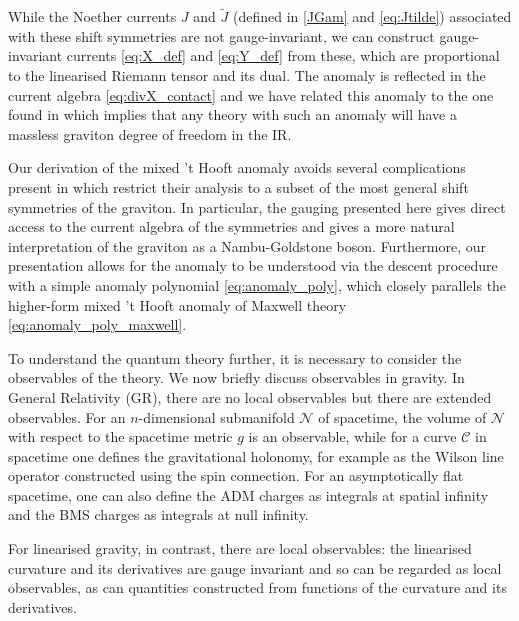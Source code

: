 While the Noether currents $J$ and $\tilde{J}$ (defined in \eqref{JGam} and \eqref{eq:Jtilde}) associated with these shift symmetries are not gauge-invariant, we can 
construct gauge-invariant currents \eqref{eq:X_def} and \eqref{eq:Y_def} from these, which are proportional to the linearised Riemann tensor and its dual. The anomaly is reflected in the current algebra \eqref{eq:divX_contact} and we have related this anomaly to the one found in \cite{Hinterbichler2023GravitySymmetries} which implies that any theory with such an anomaly will have a massless graviton degree of freedom in the IR. 

Our derivation of the mixed 't Hooft anomaly avoids several complications present in \cite{Hinterbichler2023GravitySymmetries} which restrict their analysis to a subset of the most general shift symmetries of the graviton. In particular, the gauging presented here gives direct access to the current algebra of the symmetries and gives a more natural interpretation of the graviton as a Nambu-Goldstone boson. Furthermore, our presentation allows for the anomaly to be understood via the descent procedure with a simple anomaly polynomial \eqref{eq:anomaly_poly}, which closely parallels the higher-form mixed 't Hooft anomaly of Maxwell theory \eqref{eq:anomaly_poly_maxwell}.

To understand the quantum theory further, it is necessary to consider the observables of the theory.
We now briefly discuss observables in gravity. In General Relativity (GR), there are no local observables but there are extended observables. For an $n$-dimensional submanifold $\mathcal{N}$ of spacetime, the volume of $\mathcal{N}$ with respect to the spacetime metric $g$ is an observable, while for a curve $\mathcal{C}$ in spacetime one defines the gravitational holonomy, for example as the Wilson line operator constructed using the spin connection. For an asymptotically flat spacetime, one can also define the ADM charges \cite{ADM, Abbott1982StabilityConstant} as integrals at spatial infinity and the BMS charges \cite{Bondi:1962px, Sachs:1962wk} as integrals at null infinity.

For linearised gravity, in contrast, there are local observables: the linearised curvature and its derivatives are gauge invariant and so can be regarded as local observables, as can quantities constructed from functions of the curvature and its derivatives.

